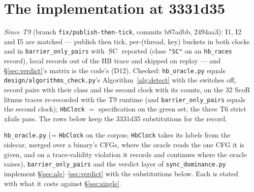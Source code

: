 \documentclass[11pt]{article}
\theoremstyle{remark}
\DeclareMathOperator{\SC}{SC}
\begin{document}
\section{The implementation at 3331d35}\label{sec:impl}

\emph{Since T9} (branch \texttt{fix/publish-then-tick}, commits b87adbb, 2494aa3): I1, I2 and I5 are
matched --- publish then tick, per-(thread, key) buckets in both clocks and in
\texttt{barrier\_only\_pairs} with $\SC$ reported (class \texttt{"SC"} on an
\texttt{hb\_races} record), local records out of the HB trace and skipped on replay --- and
\S\ref{sec:verdict}'s matrix is the code's (D12). Checked: \texttt{hb\_oracle.py} equals
\texttt{design/algorithms\_check.py}'s Algorithm~\ref{alg:detect} with the switches off, record
pairs with their class and the second clock with its counts, on the 32 ScoR litmus traces
re-recorded with the T9 runtime (and \texttt{barrier\_only\_pairs} equals the second clock);
\texttt{HbClock} $=$ specification on the green set; the three T6 strict xfails pass. The rows below keep the
3331d35 substitutions for the record.

\texttt{hb\_oracle.py} (= \texttt{HbClock} on the corpus; \texttt{HbClock} takes its labels from
the sidecar, merged over a binary's CFGs, where the oracle reads the one CFG it is given, and
on a trace-validity violation it records and continues where the oracle raises),
\texttt{barrier\_only\_pairs} and the verdict layer of \texttt{sync\_dominance.py} implement \S\ref{sec:alg}--\ref{sec:verdict} with the
substitutions below. Each is stated with what it costs against \S\ref{sec:single}.
\end{document}
